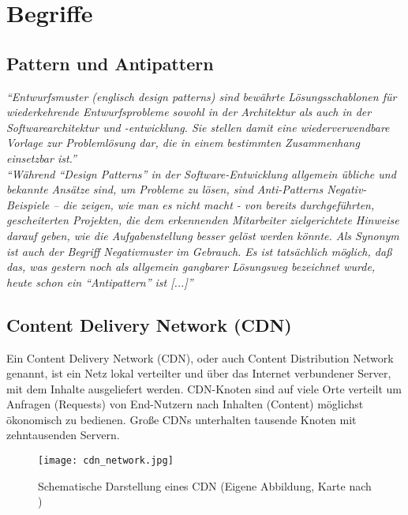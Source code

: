 
\section{Begriffe}
\label{sec:begriffe}
	\subsection{Pattern und Antipattern} %
	\label{sub:pattern_und_anti_pattern}
		\textit{"`Entwurfsmuster (englisch design patterns) sind bewährte Lösungsschablonen für wiederkehrende Entwurfsprobleme sowohl in der Architektur als auch in der Softwarearchitektur und -entwicklung. Sie stellen damit eine wiederverwendbare Vorlage zur Problemlösung dar, die in einem bestimmten Zusammenhang einsetzbar ist."'} \autocite{pattern15}
		\\

		\textit{"`Während "`Design Patterns"' in der Software-Entwicklung allgemein übliche und bekannte Ansätze sind, um Probleme zu lösen, sind Anti-Patterns Negativ-Beispiele – die zeigen, wie man es nicht macht - von bereits durchgeführten, gescheiterten Projekten, die dem erkennenden Mitarbeiter zielgerichtete Hinweise darauf geben, wie die Aufgabenstellung besser gelöst werden könnte. Als Synonym ist auch der Begriff Negativmuster im Gebrauch. Es ist tatsächlich möglich, daß das, was gestern noch als allgemein gangbarer Lösungsweg bezeichnet wurde, heute schon ein "`Antipattern"' ist [...]"'} \autocite{Stepken06}



	\subsection{Content Delivery Network (CDN)} %
	\label{sub:content_delivery_network}
		Ein Content Delivery Network (CDN), oder auch Content Distribution Network genannt, ist ein Netz lokal verteilter und über das Internet verbundener Server, mit dem Inhalte ausgeliefert werden. CDN-Knoten sind auf viele Orte verteilt um Anfragen (Requests) von End-Nutzern nach Inhalten (Content) möglichst ökonomisch zu bedienen. Große CDNs unterhalten tausende Knoten mit zehntausenden Servern.\autocite[vgl.]{wikipediaCDN}

		\begin{figure}[htbp]
			\begin{center}
				\texttt{[image: cdn\_network.jpg]}
				\caption{Schematische Darstellung eines CDN (Eigene Abbildung, Karte nach \autocite{ritz14})}
				\label{fig:cdn_network}
			\end{center}
		\end{figure}
		
